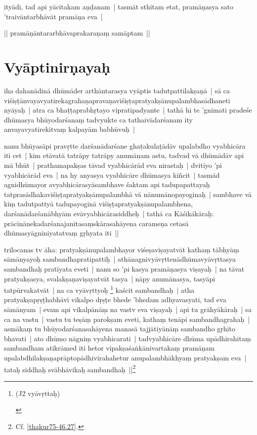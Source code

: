 \documentclass[article,12pt,a4paper]{memoir}
\newcommand{\persName}[1]{#1}
\begin{document}
	  \pstart ityādi, tad api yācitakam aṇḍanam | tasmāt sthitam etat, pramāṇasya sato 'traivāntarbhāvāt pramāṇa eva |
	\pend
      

	  \pstart || pramāṇāntararbhāvaprakaraṇaṃ samāptam || 
	\pend
      
	  
	
\section[{Vyāptinirṇayaḥ}]{Vyāptinirṇayaḥ}\label{Vyāptinirṇayaḥ}

	  \pstart iha dahanādinā dhūmāder arthāntarasya vyāptis tadutpattilakṣaṇā | sā ca viśiṣṭānvayavyatirekagrahaṇapravaṇaviśiṣṭapratyakṣānupalambhasādhaneti nyāyaḥ | atra ca bhaṭṭaprabhṛtayo vipratipadyante | tathā hi te 'gnimati pradeśe dhūmasya bhūyodarśanaṃ tadvyukte ca tathaivādarśanam ity anvayavyatirekitvaṃ kalpayām babhūvuḥ | 
	\pend
      

	  \pstart nanu bhūyasāpi pravṛtte darśanādarśane ghaṭakulaṭādāv upalabdho vyabhicāra iti cet | kim etāvatā tatrāpy tatrāpy anumānam astu, tadvad vā dhūmādāv api mā bhūt | prathamapakṣas tāvad vyabhicārād eva nirastaḥ | dvitīyo 'pi vyabhicārād eva | na hy anyasya vyabhicāre dhūmasya kiñcit | tasmād agnidhūmayor avyabhicārasyāsambhave śaktam api tadupapattayaḥ tatprasādhakaviśiṣṭapratyakṣānupalambhā vā nānumānopayoginaḥ | sambhave vā kiṃ tadutpattyā tadupayoginā viśiṣṭapratyakṣānupalambhena, darśanādarśanābhyām evāvyabhicārasiddheḥ | tathā ca Kāśikākāraḥ: prācīnānekadarśanajanitasaṃskārasahāyena carameṇa cetasā dhūmasyāgniniyatatvaṃ gṛhyata iti ||
	\pend
      

	  \pstart \persName{trilocanas} tv āha: pratyakṣānupalambhayor viśeṣaviṣayatvāt kathaṃ tābhyāṃ sāmānyayoḥ sambandhapratipattiḥ | athānagnivyāvṛttenādhūmavyāvṛttasya sambandhaḥ pratīyata eveti | nanu so 'pi kasya pramāṇasya viṣayaḥ | na tāvat pratyakṣasya, svalakṣaṇaviṣayatvāt tasya | nāpy anumānasya, tasyāpi tatpūrvakatvāt | na ca vyāvṛttyoḥ \footnote{\begin{english}(J2 vyāvṛttaḥ)\end{english}} kaścit sambandhaḥ | atha pratyakṣapṛṣṭhabhāvī vikalpo dṛṣṭe bhede 'bhedam adhyavasyati, tad eva sāmānyam | evam api vikalpānāṃ na vastv eva viṣayaḥ | api tu grāhyākāraḥ | sa ca na vastu | vastu tu teṣāṃ parokṣam eveti, kathaṃ tenāpi sambandhagrahaḥ | asmākaṃ tu bhūyodarśanasahāyena manasā tajjātīyānāṃ sambandho gṛhīto bhavati | ato dhūmo nāgniṃ vyabhicarati | tadvyabhicāre dhūma upādhirahitaṃ sambandham atikrāmed iti hetor vipakṣaśaṅkānivartakaṃ pramāṇam upalabdhilakṣaṇaprāptopādhivirahahetur anupalambhākhyaṃ pratyakṣam eva | tataḥ siddhaḥ svābhāvikaḥ sambandhaḥ ||\footnote{Cf. \cref{thakur75-46.27}.}
	\pend
      
\end{document}
